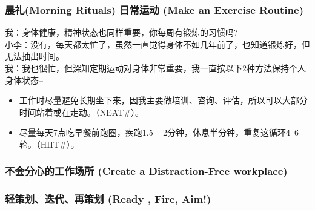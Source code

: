\hypertarget{ux6839ux56e0ux5206ux6790ux8befux89e3ux6848ux4f8b}{%
\subsubsection{晨礼(Morning Rituals) 日常运动 (Make an Exercise Routine)}\label{ux6839ux56e0ux5206ux6790ux8befux89e3ux6848ux4f8b}}



我：身体健康，精神状态也同样重要，你每周有锻炼的习惯吗?\\
小李：没有，每天都太忙了，虽然一直觉得身体不如几年前了，也知道锻炼好，但无法抽出时间。\\
我：我也很忙，但深知定期运动对身体非常重要，我一直按以下2种方法保持个人身体状态--

\begin{itemize}
\tightlist
\item
  工作时尽量避免长期坐下来，因我主要做培训、咨询、评估，所以可以大部分时间站着或在走动。（NEAT\#）。
\item
  尽量每天7点吃早餐前跑圈，疾跑1.5 ~ 
  2分钟，休息半分钟，重复这循环4~6轮。（HIIT\#）。
\end{itemize}

\hypertarget{ux6839ux56e0ux5206ux6790ux8befux89e3ux6848ux4f8b}{%
\subsubsection{不会分心的工作场所 (Create a Distraction-Free workplace)}\label{ux6839ux56e0ux5206ux6790ux8befux89e3ux6848ux4f8b}}

\hypertarget{ux6839ux56e0ux5206ux6790ux8befux89e3ux6848ux4f8b}{%
\subsubsection{轻策划、迭代、再策划 (Ready , Fire, Aim!)}\label{ux6839ux56e0ux5206ux6790ux8befux89e3ux6848ux4f8b}}

